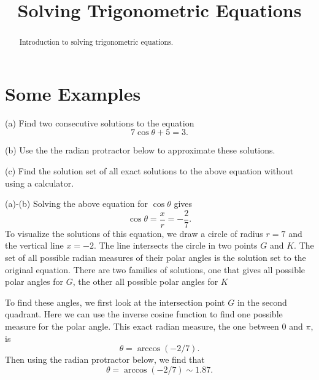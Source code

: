 \documentclass{ximera}
\title{Solving Trigonometric Equations}
\begin{document}
\begin{abstract}
Introduction to solving trigonometric equations.
\end{abstract}
\maketitle

\section{Some Examples}

\begin{example}  \label{Ex:43733g3e}
(a) Find two consecutive solutions to the equation
\[
    7 \cos\theta +5 =  3 .  
\]

(b) Use the the radian protractor below to approximate these solutions.

(c) Find the solution set of all exact solutions to the above equation without using a calculator.

\begin{explanation}
(a)-(b) Solving the above equation for $\cos\theta$ gives 
\[
   \cos \theta = \frac{x}{r} = -\frac{2}{7}.
\]
To visualize the solutions of this equation, we draw a circle of radius $r=7$ and the vertical line $x=-2$. The line intersects the circle in two points $G$ and $K$. The set of all possible radian measures of their polar angles is the solution set to the original equation. There are two families of solutions, one that gives all possible polar angles for $G$, the other all possible polar angles for $K$
 
 
\begin{onlineOnly}
    \begin{center}
\end{center}
\end{onlineOnly}


To find these angles, we first look at the intersection point $G$ in the second quadrant. Here we can use the inverse cosine function to find one possible measure for the polar angle. This exact radian measure, the one between $0$ and $\pi$, is 
\[
  \theta = \arccos(-2/7).
\]
Then using the radian protractor below, we find that
\[
   \theta  = \arccos(-2/7) \sim 1.87 .
\]




\end{explanation}
\end{example}
\end{document}
